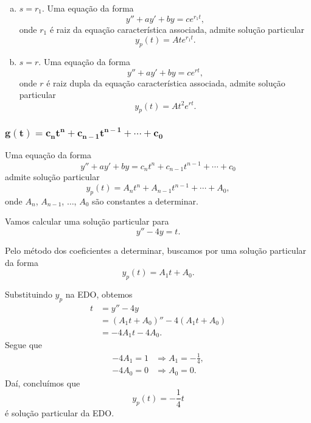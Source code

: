 \begin{obs}
  \begin{enumerate}[a)]
  \item $s = r_1$.
    Uma equação da forma
    \begin{equation}
      y'' + ay' + by = ce^{r_1t},
    \end{equation}
    onde $r_1$ é raiz da equação característica associada, admite solução particular
    \begin{equation}
      y_p(t) = Ate^{r_1t}.
    \end{equation}
  \item $s = r$.
    Uma equação da forma
    \begin{equation}
      y'' + ay' + by = ce^{rt},
    \end{equation}
    onde $r$ é raiz dupla da equação característica associada, admite solução particular
    \begin{equation}
      y_p(t) = At^2e^{rt}.
    \end{equation}
  \end{enumerate}
\end{obs}

\subsubsection{$\pmb{g(t) = c_nt^n + c_{n-1}t^{n-1} + \cdots + c_0}$}

Uma equação da forma
\begin{equation}
  y'' + ay' + by = c_nt^n + c_{n-1}t^{n-1} + \cdots + c_0
\end{equation}
admite solução particular
\begin{equation}
  y_p(t) = A_nt^n + A_{n-1}t^{n-1} + \cdots + A_0,
\end{equation}
onde $A_n$, $A_{n-1}$, $\dotsc$, $A_0$ são constantes a determinar.

\begin{ex}
  Vamos calcular uma solução particular para
  \begin{equation}
    y'' - 4y = t.
  \end{equation}

  Pelo método dos coeficientes a determinar, buscamos por uma solução particular da forma
  \begin{equation}
    y_p(t) = A_1t + A_0.
  \end{equation}

  Substituindo $y_p$ na EDO, obtemos
  \begin{align}
    t &= y'' - 4y \\
      &= \left(A_1t + A_0\right)'' - 4(A_1t + A_0) \\
           &= -4A_1t - 4A_0.
  \end{align}
  Segue que
  \begin{align}
    -4A_1 = 1 &\Rightarrow A_1 = -\frac{1}{4},\\
    -4A_0 = 0 &\Rightarrow A_0 = 0.
  \end{align}
  Daí, concluímos que
  \begin{equation}
    y_p(t) = -\frac{1}{4}t
  \end{equation}
  é solução particular da EDO.
\end{ex}

